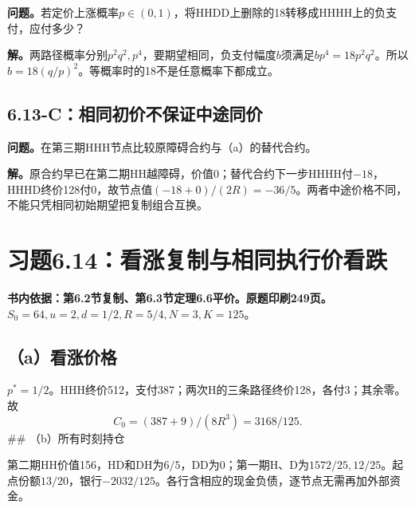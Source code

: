 \documentclass[11pt,a4paper,UTF8,fontset=fandol]{ctexart}
\begin{document}
\textbf{问题。}若定价上涨概率\(p\in(0,1)\)，将HHDD上删除的18转移成HHHH上的负支付，应付多少？

\textbf{解。}两路径概率分别\(p^2q^2,p^4\)，要期望相同，负支付幅度\(b\)须满足\(bp^4=18p^2q^2\)。所以\(\boxed{b=18(q/p)^2}\)。等概率时的18不是任意概率下都成立。

\subsection{6.13-C：相同初价不保证中途同价}\label{cux76f8ux540cux521dux4ef7ux4e0dux4fddux8bc1ux4e2dux9014ux540cux4ef7}

\textbf{问题。}在第三期HHH节点比较原障碍合约与（a）的替代合约。

\textbf{解。}原合约早已在第二期HH越障碍，价值0；替代合约下一步HHHH付\(-18\)，HHHD终价128付0，故节点值\((-18+0)/(2R)=\boxed{-36/5}\)。两者中途价格不同，不能只凭相同初始期望把复制组合互换。

\bigskip

\section{习题6.14：看涨复制与相同执行价看跌}\label{ux4e60ux98986.14ux770bux6da8ux590dux5236ux4e0eux76f8ux540cux6267ux884cux4ef7ux770bux8dcc}

\textbf{书内依据：第6.2节复制、第6.3节定理6.6平价。原题印刷249页。}\(S_0=64,u=2,d=1/2,R=5/4,N=3,K=125\)。

\subsection{（a）看涨价格}\label{aux770bux6da8ux4ef7ux683c}

\(p^*=1/2\)。HHH终价512，支付387；两次H的三条路径终价128，各付3；其余零。故
\[\boxed{C_0=(387+9)/(8R^3)=3168/125.}\] \#\# （b）所有时刻持仓

第二期HH价值156，HD和DH为\(6/5\)，DD为0；第一期H、D为\(1572/25,12/25\)。起点份额\(13/20\)，银行\(-2032/125\)。各行含相应的现金负债，逐节点无需再加外部资金。

\begingroup
\small
\setlength{\tabcolsep}{4pt}
\renewcommand{\arraystretch}{1.10}
\end{document}
